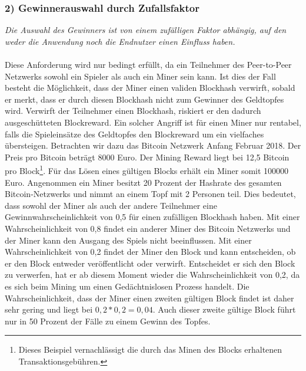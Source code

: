 \subsubsection{2) Gewinnerauswahl durch Zufallsfaktor}
\textit{Die Auswahl des Gewinners ist von einem zufälligen Faktor abhängig, auf den weder die Anwendung noch die Endnutzer einen Einfluss haben.}\\\\
Diese Anforderung wird nur bedingt erfüllt, da ein Teilnehmer des Peer-to-Peer Netzwerks sowohl ein Spieler als auch ein Miner sein kann. Ist dies der Fall besteht die Möglichkeit, dass der Miner einen validen Blockhash verwirft, sobald er merkt, dass er durch diesen Blockhash nicht zum Gewinner des Geldtopfes wird. Verwirft der Teilnehmer einen Blockhash, riskiert er den dadurch ausgeschütteten Blockreward. Ein solcher Angriff ist für einen Miner nur rentabel, falls die Spieleinsätze des Geldtopfes den Blockreward um ein vielfaches übersteigen.
Betrachten wir dazu das Bitcoin Netzwerk Anfang Februar 2018. Der Preis pro Bitcoin beträgt 8000 Euro. Der Mining Reward liegt bei 12,5 Bitcoin pro Block\footnote{Dieses Beispiel vernachlässigt die durch das Minen des Blocks erhaltenen Transaktionsgebühren.}. Für das Lösen eines gültigen Blocks erhält ein Miner somit 100000 Euro. Angenommen ein Miner besitzt 20 Prozent der Hashrate des gesamten Bitcoin-Netzwerks und nimmt an einem Topf mit 2 Personen teil. Dies bedeutet, dass sowohl der Miner als auch der andere Teilnehmer eine Gewinnwahrscheinlichkeit von 0,5 für einen zufälligen Blockhash haben.
Mit einer Wahrscheinlichkeit von 0,8 findet ein anderer Miner des Bitcoin Netzwerks und der Miner kann den Ausgang des Spiels nicht beeinflussen. Mit einer Wahrscheinlichkeit von 0,2 findet der Miner den Block und kann entscheiden, ob er den Block entweder veröffentlicht oder verwirft. Entscheidet er sich den Block zu verwerfen, hat er ab diesem Moment wieder die Wahrscheinlichkeit von 0,2, da es sich beim Mining um einen Gedächtnislosen Prozess handelt. Die Wahrscheinlichkeit, dass der Miner einen zweiten gültigen Block findet ist daher sehr gering und liegt bei $0,2 * 0,2 = 0,04$. Auch dieser zweite gültige Block führt nur in 50 Prozent der Fälle zu einem Gewinn des Topfes.



